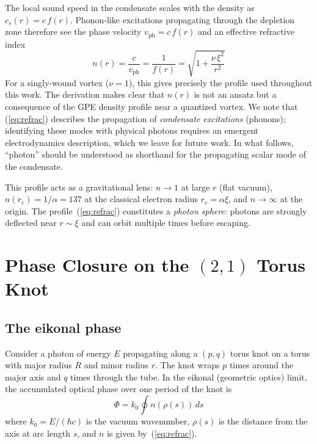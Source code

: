 \documentclass[11pt,a4paper]{article}
\begin{document}
The local sound speed in the condensate scales with the density as
$c_s(r) = c\,f(r)$.  Phonon-like excitations propagating through
the depletion zone therefore see the phase velocity
$v_{\text{ph}} = c\,f(r)$ and an effective refractive index
\begin{equation}
  n(r) = \frac{c}{v_{\text{ph}}} = \frac{1}{f(r)}
  = \sqrt{1 + \frac{\nu\,\xi^2}{r^2}}
  \label{eq:refrac}
\end{equation}
For a singly-wound vortex ($\nu = 1$), this gives precisely the
profile used throughout this work.  The derivation makes clear that
$n(r)$ is not an ansatz but a consequence of the GPE density
profile near a quantized vortex.  We note that (\ref{eq:refrac})
describes the propagation of \emph{condensate excitations} (phonons);
identifying these modes with physical photons requires an emergent
electrodynamics description, which we leave for future work.  In
what follows, ``photon'' should be understood as shorthand for the
propagating scalar mode of the condensate.

This profile acts as a gravitational lens: $n \to 1$ at large $r$
(flat vacuum), $n(r_e) = 1/\alpha = 137$ at the classical electron
radius $r_e = \alpha\xi$, and $n \to \infty$ at the origin.  The
profile~(\ref{eq:refrac}) constitutes a \emph{photon sphere}:
photons are strongly deflected near $r \sim \xi$ and can orbit
multiple times before escaping.


\section{Phase Closure on the $(2,1)$ Torus Knot}
\label{sec:phase}

\subsection{The eikonal phase}

Consider a photon of energy $E$ propagating along a $(p,q)$ torus
knot on a torus with major radius $R$ and minor radius $r$.  The
knot wraps $p$ times around the major axis and $q$ times through
the tube.  In the eikonal (geometric optics) limit, the accumulated
optical phase over one period of the knot is
\begin{equation}
  \Phi = k_0 \oint n(\rho(s))\,ds
  \label{eq:phase}
\end{equation}
where $k_0 = E/(\hbar c)$ is the vacuum wavenumber, $\rho(s)$ is
the distance from the axis at arc length $s$, and $n$ is given
by~(\ref{eq:refrac}).
\end{document}
